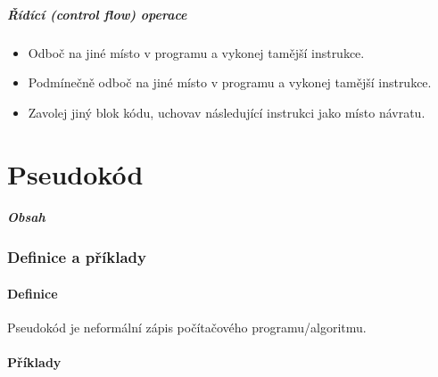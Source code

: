 \documentclass[aspectratio=169,11pt,handout]{beamer}
\begin{document}
\begin{frame}
 \frametitle{Řídící (control flow) operace}
 \begin{itemize}
  \item<1-> \alert{Odboč} na jiné místo v programu a vykonej tamější instrukce.
  \item<2-> \alert{Podmínečně odboč} na jiné místo v programu a vykonej tamější
   instrukce.
  \item<3-> \alert{Zavolej} jiný blok kódu, uchovav následující instrukci jako
   místo návratu.
 \end{itemize}
\end{frame}

\part[Pseudokód]{Pseudokód}

\begin{frame}
 \partpage
\end{frame}

\begin{frame}
 \frametitle{Obsah}
 \tableofcontents
\end{frame}

\section[Definice a příklady]{Definice a příklady}
\subsection[Definice]{Definice}

\begin{frame}
 \begin{tcolorbox}[title=Pseudokód,center,width=.95\textwidth]
  Pseudokód je \alert{neformální} zápis počítačového programu/algoritmu.
 \end{tcolorbox}
\end{frame}

\subsection[Příklady]{Příklady}
\end{document}
